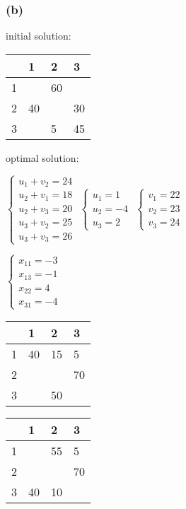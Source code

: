 \documentclass{article}
\begin{document}
\subsubsection*{(b)}
initial solution:\par\indent
\par
\begin{tabular}{|l|l|l|l|}
\hline
  & 1  & 2  & 3  \\ \hline
1 &    & 60 &    \\ \hline
2 & 40 &    & 30 \\ \hline
3 &    & 5  & 45 \\ \hline
\end{tabular}\par\indent
\par
optimal solution:\par\indent
\par
$\begin{cases}u_{1}+v_{2}=24\\
u_{2}+v_{1}=18\\
u_{2}+v_{3}=20\\
u_{3}+v_{2}=25\\
u_{3}+v_{3}=26\end{cases}$
$\begin{cases}u_{1}=1\\
u_{2}=-4\\
u_{3}=2\end{cases}$
$\begin{cases}v_{1}=22\\
v_{2}=23\\
v_{3}=24\end{cases}$\par\indent
\par\indent
\par
$\begin{cases}x_{11}=-3\\
x_{13}=-1\\
x_{22}=4\\
x_{31}=-4\end{cases}$\par\indent
\par\indent
\par
\begin{tabular}{|l|l|l|l|}
\hline
  & 1  & 2  & 3  \\ \hline
1 & 40 & 15  & 5 \\ \hline
2 &    &  & 70 \\ \hline
3 &   &  50  &  \\ \hline
\end{tabular}
\begin{tabular}{|l|l|l|l|}
\hline
  & 1  & 2  & 3  \\ \hline
1 &  & 55 & 5 \\ \hline
2 &  &    & 70 \\ \hline
3 & 40  & 10 &    \\ \hline
\end{tabular}
\end{document}
